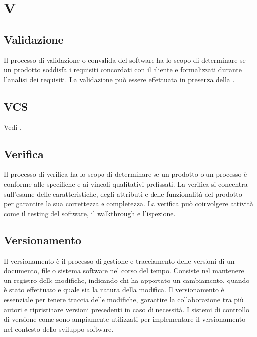 \section{V}

\vspace{2em}
\subsection*{Validazione}
\par Il processo di validazione o convalida del software ha lo scopo di determinare se un prodotto soddisfa i requisiti concordati con il cliente e formalizzati durante l'analisi dei requisiti. La validazione può essere effettuata in presenza della .

\vspace{2em}
\subsection*{VCS}
\par Vedi .

\vspace{2em}
\subsection*{Verifica}
\par Il processo di verifica ha lo scopo di determinare se un prodotto o un processo è conforme alle specifiche e ai vincoli qualitativi prefissati. La verifica si concentra sull'esame delle caratteristiche, degli attributi e delle funzionalità del prodotto per garantire la sua correttezza e completezza. La verifica può coinvolgere attività come il testing del software, il walkthrough e l'ispezione.

\vspace{2em}
\subsection*{Versionamento}
\par Il versionamento è il processo di gestione e tracciamento delle versioni di un documento, file o sistema software nel corso del tempo. Consiste nel mantenere un registro delle modifiche, indicando chi ha apportato un cambiamento, quando è stato effettuato e quale sia la natura della modifica. Il versionamento è essenziale per tenere traccia delle modifiche, garantire la collaborazione tra più autori e ripristinare versioni precedenti in caso di necessità. I sistemi di controllo di versione come  sono ampiamente utilizzati per implementare il versionamento nel contesto dello sviluppo software.

